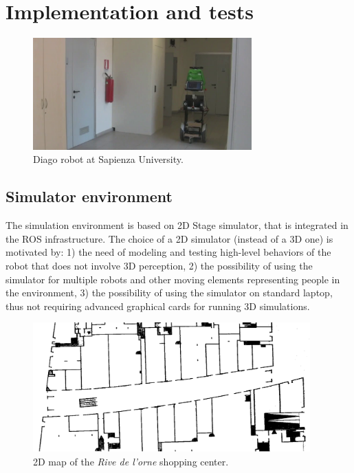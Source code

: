 \section{Implementation and tests}



\begin{figure}
\centering
\includegraphics[width=0.75\textwidth]{fig/diago.png}
\caption{Diago robot at Sapienza University.}
\label{fig:diago}
\end{figure}



\subsection{Simulator environment}

The simulation environment is based on 2D Stage simulator, that is integrated in the ROS infrastructure. The choice of a 2D simulator (instead of a 3D one) is motivated by: 1) the need of modeling and testing high-level behaviors of the robot that does not involve 3D perception, 2) the possibility of using the simulator for multiple robots and other moving elements representing people in the environment, 3) the possibility of using the simulator on standard laptop, thus not requiring advanced graphical cards for running 3D simulations.

\begin{figure}
\centering
\includegraphics[width=0.95\textwidth]{fig/Rive1.png}
\caption{2D map of the \emph{Rive de l'orne} shopping center.}
\label{fig:stage}
\end{figure}


